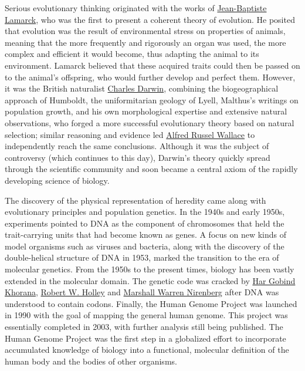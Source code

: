 \documentclass[
]{article}
\begin{document}
Serious evolutionary thinking originated with the works of
\href{https://en.wikipedia.org/wiki/Jean-Baptiste_Lamarck}{Jean-Baptiste
Lamarck}, who was the first to present a coherent theory of evolution.
He posited that evolution was the result of environmental stress on
properties of animals, meaning that the more frequently and rigorously
an organ was used, the more complex and efficient it would become, thus
adapting the animal to its environment. Lamarck believed that these
acquired traits could then be passed on to the animal's offspring, who
would further develop and perfect them. However, it was the British
naturalist \href{https://en.wikipedia.org/wiki/Charles_Darwin}{Charles
Darwin}, combining the biogeographical approach of Humboldt, the
uniformitarian geology of Lyell, Malthus's writings on population
growth, and his own morphological expertise and extensive natural
observations, who forged a more successful evolutionary theory based on
natural selection; similar reasoning and evidence led
\href{https://en.wikipedia.org/wiki/Alfred_Russel_Wallace}{Alfred Russel
Wallace} to independently reach the same conclusions. Although it was
the subject of controversy (which continues to this day), Darwin's
theory quickly spread through the scientific community and soon became a
central axiom of the rapidly developing science of biology.

The discovery of the physical representation of heredity came along with
evolutionary principles and population genetics. In the 1940s and early
1950s, experiments pointed to DNA as the component of chromosomes that
held the trait-carrying units that had become known as genes. A focus on
new kinds of model organisms such as viruses and bacteria, along with
the discovery of the double-helical structure of DNA in 1953, marked the
transition to the era of molecular genetics. From the 1950s to the
present times, biology has been vastly extended in the molecular domain.
The genetic code was cracked by
\href{https://en.wikipedia.org/wiki/Har_Gobind_Khorana}{Har Gobind
Khorana}, \href{https://en.wikipedia.org/wiki/Robert_W._Holley}{Robert
W. Holley} and
\href{https://en.wikipedia.org/wiki/Marshall_Warren_Nirenberg}{Marshall
Warren Nirenberg} after DNA was understood to contain codons. Finally,
the Human Genome Project was launched in 1990 with the goal of mapping
the general human genome. This project was essentially completed in
2003, with further analysis still being published. The Human Genome
Project was the first step in a globalized effort to incorporate
accumulated knowledge of biology into a functional, molecular definition
of the human body and the bodies of other organisms.
\end{document}

